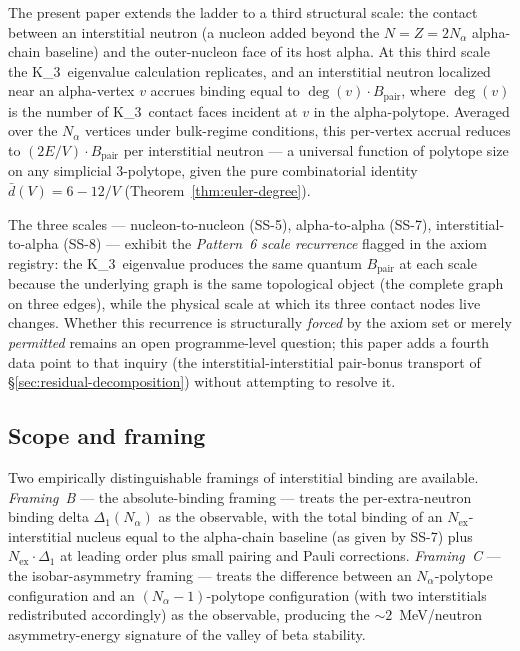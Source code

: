 \documentclass[11pt,letterpaper]{article}
\theoremstyle{definition}
\newcommand{\Bpair}{B_{\text{pair}}}
\newcommand{\Nalpha}{N_\alpha}
\newcommand{\Nex}{N_{\text{ex}}}
\newcommand{\Kthree}{K_3}
\newcommand{\degv}{\deg(v)}
\begin{document}
The present paper extends the ladder to a third structural scale: the contact between an interstitial neutron (a nucleon added beyond the $N = Z = 2\Nalpha$ alpha-chain baseline) and the outer-nucleon face of its host alpha. At this third scale the \Kthree\ eigenvalue calculation replicates, and an interstitial neutron localized near an alpha-vertex $v$ accrues binding equal to $\degv \cdot \Bpair$, where $\degv$ is the number of \Kthree\ contact faces incident at $v$ in the alpha-polytope. Averaged over the $\Nalpha$ vertices under bulk-regime conditions, this per-vertex accrual reduces to $(2E/V) \cdot \Bpair$ per interstitial neutron --- a universal function of polytope size on any simplicial 3-polytope, given the pure combinatorial identity $\bar{d}(V) = 6 - 12/V$ (Theorem~\ref{thm:euler-degree}).

The three scales --- nucleon-to-nucleon (SS-5), alpha-to-alpha (SS-7), interstitial-to-alpha (SS-8) --- exhibit the \emph{Pattern~6 scale recurrence} flagged in the axiom registry: the \Kthree\ eigenvalue produces the same quantum $\Bpair$ at each scale because the underlying graph is the same topological object (the complete graph on three edges), while the physical scale at which its three contact nodes live changes. Whether this recurrence is structurally \emph{forced} by the axiom set or merely \emph{permitted} remains an open programme-level question; this paper adds a fourth data point to that inquiry (the interstitial-interstitial pair-bonus transport of \S\ref{sec:residual-decomposition}) without attempting to resolve it.

\subsection{Scope and framing}
\label{sec:framing}

Two empirically distinguishable framings of interstitial binding are available. \emph{Framing~B} --- the absolute-binding framing --- treats the per-extra-neutron binding delta $\Delta_1(\Nalpha)$ as the observable, with the total binding of an $\Nex$-interstitial nucleus equal to the alpha-chain baseline (as given by SS-7) plus $\Nex \cdot \Delta_1$ at leading order plus small pairing and Pauli corrections. \emph{Framing~C} --- the isobar-asymmetry framing --- treats the difference between an $\Nalpha$-polytope configuration and an $(\Nalpha - 1)$-polytope configuration (with two interstitials redistributed accordingly) as the observable, producing the $\sim 2$~MeV/neutron asymmetry-energy signature of the valley of beta stability.
\end{document}
